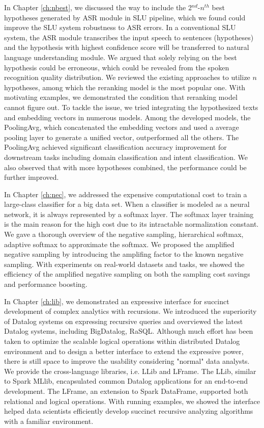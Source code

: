 \documentclass [PhD] {uclathes}
\begin{document}
In Chapter \ref{ch:nbest}, we discussed the way to include the 2$^{nd}$-$n^{th}$ best hypotheses generated by ASR module in SLU pipeline, which we found  could improve the SLU system robustness to ASR errors. In a conventional SLU system, the ASR module transcribes the input speech to sentences (hypotheses)  and the hypothesis with highest confidence score will be transferred to natural language understanding module. We argued that solely relying on the best hypothesis could be erroneous, which could be revealed from  the spoken recognition quality distribution. We reviewed the existing approaches to utilize $n$ hypotheses, among which  the reranking model is the most popular one. With motivating examples, we demonstrated the condition that reranking model cannot figure out. To tackle the issue, we tried integrating the hypothesized texts and embedding vectors in numerous models. Among the developed models, the PoolingAvg, which concatenated the embedding vectors and used a average pooling layer to generate a unified vector, outperformed all the others.  The PoolingAvg achieved significant classification accuracy improvement for downstream tasks including domain classification and intent classification. We also observed that with more hypotheses combined, the performance could be further improved. 

In Chapter \ref{ch:nec}, we addressed the expensive computational cost to train a large-class classifier for a big data set. When a classifier is modeled as a neural network, it is always represented by a softmax layer. The softmax layer training is the main reason for the high cost due to its intractable normalization constant. We gave a thorough overview of  the  negative sampling, hierarchical softmax, adaptive softmax to approximate the softmax.  We proposed the amplified negative sampling by introducing the amplifing factor to the known negative sampling. With experiments on real-world datasets and tasks, we showed the efficiency of the amplified negative sampling on both the sampling cost savings and performance  boosting. 

In Chapter \ref{ch:lib}, we demonstrated an expressive interface for succinct development of complex analytics with recursions.  We introduced the superiority of Datalog systems on expressing recursive queries and overviewed the latest Datalog systems, including BigDatalog, RaSQL. Although much effort has been taken to optimize the scalable logical operations  within distributed Datalog environment and to  design a better interface to extend the expressive power, there is still space to improve the usability considering  "normal" data analysts. We provide the cross-language libraries, i.e. LLib and LFrame. The LLib, similar to Spark MLlib,  encapsulated common Datalog applications for an end-to-end development. The LFrame, an extension to Spark DataFrame, supported both relational and logical operations. With running examples, we showed the interface helped data scientists  efficiently develop succinct recursive analyzing algorithms with a familiar environment.
\end{document}
